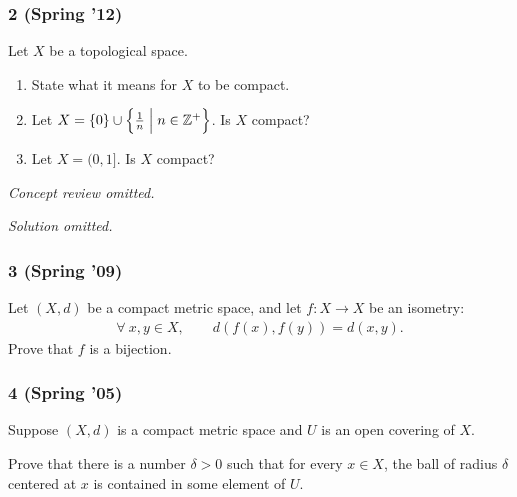 \hypertarget{spring-12}{%
\subsubsection{2 (Spring '12)}\label{spring-12}}

\begin{problem}[?]

Let \(X\) be a topological space.

\begin{enumerate}
\def\labelenumi{\alph{enumi}.}
\item
  State what it means for \(X\) to be compact.
\item
  Let
  \(X = \left\{{0}\right\} \cup \left\{{{1\over n} \mathrel{\Big|}n \in {\mathbb{Z}}^+ }\right\}\).
  Is \(X\) compact?
\item
  Let \(X = (0, 1]\). Is \(X\) compact?
\end{enumerate}

\end{problem}


\emph{Concept review omitted.}

\emph{Solution omitted.}

\hypertarget{spring-09}{%
\subsubsection{3 (Spring '09)}\label{spring-09}}

\begin{problem}[?]

Let \((X, d)\) be a compact metric space, and let \(f : X \to X\) be an
isometry:
\begin{align*}
\forall~ x, y \in X, \qquad d(f (x), f (y)) = d(x, y)
.\end{align*}
Prove that \(f\) is a bijection.

\end{problem}

\hypertarget{spring-05}{%
\subsubsection{4 (Spring '05)}\label{spring-05}}

\begin{problem}[?]

Suppose \((X, d)\) is a compact metric space and \(U\) is an open
covering of \(X\).

Prove that there is a number \(\delta > 0\) such that for every
\(x \in X\), the ball of radius \(\delta\) centered at \(x\) is
contained in some element of \(U\).

\end{problem}

